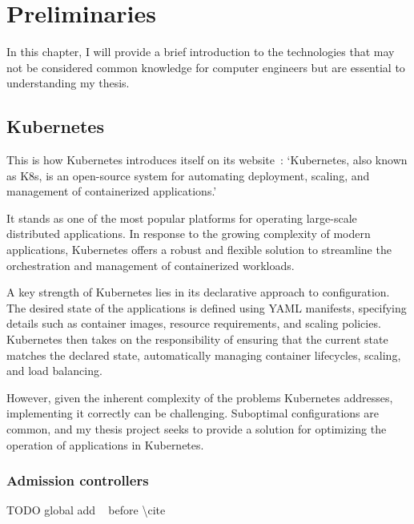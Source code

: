 \setlength{\parindent}{0pt}
\setlength{\parskip}{0.6em}

\chapter{Preliminaries}
\label{chap:prerequisites}

In this chapter, I will provide a brief introduction to the technologies that may not be considered common knowledge for computer engineers but are essential to understanding my thesis.

\section{Kubernetes}

This is how Kubernetes introduces itself on its website~\cite{K8s}: `Kubernetes, also known as K8s, is an open-source system for automating deployment, scaling, and management of containerized applications.'

It stands as one of the most popular platforms for operating large-scale distributed applications. In response to the growing complexity of modern applications, Kubernetes offers a robust and flexible solution to streamline the orchestration and management of containerized workloads.

A key strength of Kubernetes lies in its declarative approach to configuration. The desired state of the applications is defined using YAML manifests, specifying details such as container images, resource requirements, and scaling policies. Kubernetes then takes on the responsibility of ensuring that the current state matches the declared state, automatically managing container lifecycles, scaling, and load balancing.

However, given the inherent complexity of the problems Kubernetes addresses, implementing it correctly can be challenging. Suboptimal configurations are common, and my thesis project seeks to provide a solution for optimizing the operation of applications in Kubernetes.

\subsection{Admission controllers}
\label{sec:admcont}

TODO global add ~ before \textbackslash cite

